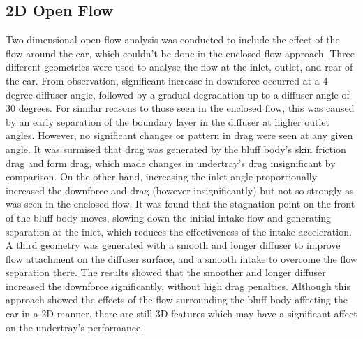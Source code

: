 \subsection{2D Open Flow}
Two dimensional open flow analysis was conducted to include the effect of the flow around the car, which couldn't be done in the enclosed flow approach. Three different geometries were used to analyse the flow at the inlet, outlet, and rear of the car. From observation, significant increase in downforce occurred at a 4 degree diffuser angle, followed by a gradual degradation up to a diffuser angle of 30 degrees. For similar reasons to those seen in the enclosed flow, this was caused by an early separation of the boundary layer in the diffuser at higher outlet angles. However, no significant changes or pattern in drag were seen at any given angle. It was surmised that drag was generated by the bluff body's skin friction drag and form drag, which made changes in undertray's drag insignificant by comparison. On the other hand, increasing the inlet angle proportionally increased the downforce and drag (however insignificantly) but not so strongly as was seen in the enclosed flow. It was found that the stagnation point on the front of the bluff body moves, slowing down the initial intake flow and generating separation at the inlet, which reduces the effectiveness of the intake acceleration. A third geometry was generated with a smooth and longer diffuser to improve flow attachment on the diffuser surface, and a smooth intake to overcome the flow separation there. The results showed that the smoother and longer diffuser increased the downforce significantly, without high drag penalties. Although this approach showed the effects of the flow surrounding the bluff body affecting the car in a 2D manner, there are still 3D features which may have a significant affect on the undertray's performance.


